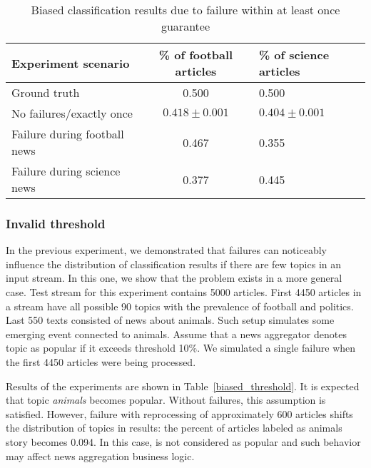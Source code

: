 \begin{table}[htbp]
\caption{Biased classification results due to failure within at least once guarantee}
\begin{threeparttable}
\begin{tabular}{lcl}
Experiment scenario    & \% of football articles & \% of science articles    \\
\hline
Ground truth   &   0.500    &   0.500    \\
No failures/exactly once   &   $0.418\pm 0.001$    &   $0.404\pm 0.001$    \\
Failure during football news   &   0.467    &   0.355    \\
Failure during science news   &   0.377    &   0.445    \\
\end{tabular}
\end{threeparttable}
\label{biased_results}
\end{table}

\subsubsection{Invalid threshold}

In the previous experiment, we demonstrated that failures can noticeably influence the distribution of classification results if there are few topics in an input stream. In this one, we show that the problem exists in a more general case. Test stream for this experiment contains 5000 articles. First 4450 articles in a stream have all possible 90 topics with the prevalence of football and politics. Last 550 texts consisted of news about animals. Such setup simulates some emerging event connected to animals. Assume that a news aggregator denotes topic as popular if it exceeds threshold 10\%. We simulated a single failure when the first 4450 articles were being processed.

Results of the experiments are shown in Table~\ref{biased_threshold}. It is expected that topic {\em animals} becomes popular. Without failures, this assumption is satisfied. However, failure with reprocessing of approximately 600 articles shifts the distribution of topics in results: the percent of articles labeled as animals story becomes 0.094. In this case, is not considered as popular and such behavior may affect news aggregation business logic.

